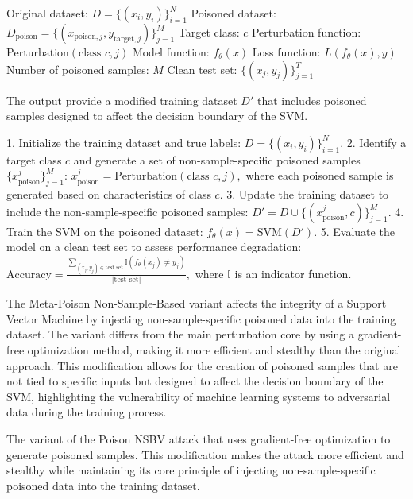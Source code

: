 Original dataset: $D = \{(x_i, y_i)\}_{i=1}^{N}$  
Poisoned dataset: $D_{\text{poison}} = \{(x_{\text{poison},j}, y_{\text{target},j})\}_{j=1}^{M}$  
Target class: $c$  
Perturbation function: $\text{Perturbation}(\text{class } c, j)$  
Model function: $f_{\theta}(x)$  
Loss function: $L(f_{\theta}(x), y)$  
Number of poisoned samples: $M$  
Clean test set: $\{(x_j, y_j)\}_{j=1}^{T}$ 

The output provide a modified training dataset $D'$ that includes poisoned samples designed to affect the decision boundary of the SVM.

1. Initialize the training dataset and true labels:
   $
   D = \{(x_i, y_i)\}_{i=1}^N.
   $
2. Identify a target class $c$ and generate a set of non-sample-specific poisoned samples $\{x_{\text{poison}}^j\}_{j=1}^M$:
   $
   x_{\text{poison}}^j = \text{Perturbation}(\text{class } c, j),
   $
   where each poisoned sample is generated based on characteristics of class $c$.
3. Update the training dataset to include the non-sample-specific poisoned samples:
   $
   D' = D \cup \{(x_{\text{poison}}^j, c)\}_{j=1}^M.
   $
4. Train the SVM on the poisoned dataset:
   $
   f_{\theta}(x) = \text{SVM}(D').
   $
5. Evaluate the model on a clean test set to assess performance degradation:
   $
   \text{Accuracy} = \frac{\sum_{(x_j, y_j) \in \text{test set}} \mathbb{I}(f_{\theta}(x_j) \neq y_j)}{|\text{test set}|},
   $
   where $ \mathbb{I} $ is an indicator function.

The Meta-Poison Non-Sample-Based variant affects the integrity of a Support Vector Machine by injecting non-sample-specific poisoned data into the training dataset. The variant differs from the main perturbation core by using a gradient-free optimization method, making it more efficient and stealthy than the original approach. This modification allows for the creation of poisoned samples that are not tied to specific inputs but designed to affect the decision boundary of the SVM, highlighting the vulnerability of machine learning systems to adversarial data during the training process.

The variant of the Poison NSBV attack that uses gradient-free optimization to generate poisoned samples. This modification makes the attack more efficient and stealthy while maintaining its core principle of injecting non-sample-specific poisoned data into the training dataset.